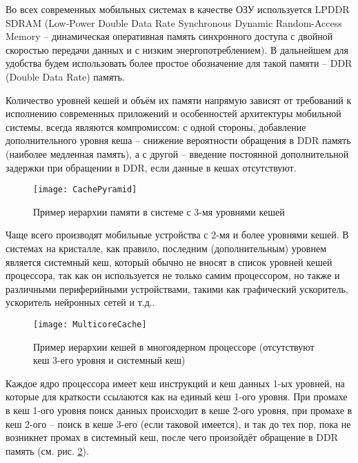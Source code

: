     Во всех современных мобильных системах в качестве ОЗУ используется LPDDR SDRAM
    (Low-Power Double Data Rate Synchronous Dynamic Random-Access Memory --
    динамическая оперативная память синхронного доступа с двойной скоростью передачи данных и
    с низким энергопотреблением). В дальнейшем для удобства будем использовать более простое
    обозначение для такой памяти -- DDR (Double Data Rate) память.

    Количество уровней кешей и объём их памяти напрямую зависят от требований к исполнению
    современных приложений и особенностей архитектуры мобильной системы,
    всегда являются компромиссом: с одной стороны, добавление дополнительного
    уровня кеша -- снижение вероятности обращения в DDR память (наиболее медленная память),
    а с другой -- введение постоянной дополнительной задержки при обращении в DDR, если данные
    в кешах отсутствуют.

    \begin{figure}[!h]
        \caption{Пример иерархии памяти в системе с 3-мя уровнями кешей}
        \centering
        \texttt{[image: CachePyramid]}
        \label{CachePyramid}
    \end{figure}

    Чаще всего производят мобильные устройства с 2-мя и более уровнями кешей. В системах на кристалле,
    как правило, последним (дополнительным) уровнем является системный кеш, который обычно
    не вносят в список уровней кешей процессора, так как он используется не только самим процессором,
    но также и различными периферийными устройствами, такими как графический ускоритель, ускоритель
    нейронных сетей и т.д..

    \begin{figure}[!h]
        \caption{Пример иерархии кешей в многоядерном процессоре (отсутствуют кеш 3-его уровня
            и системный кеш)}
        \centering
        \texttt{[image: MulticoreCache]}
        \label{MulticoreCache}
    \end{figure}

    Каждое ядро процессора имеет кеш инструкций и кеш данных 1-ых уровней, на которые для краткости
    ссылаются как на единый кеш 1-ого уровня.
    При промахе в кеш 1-ого уровня поиск данных происходит в кеше 2-ого уровня, при промахе
    в кеш 2-ого -- поиск в кеше 3-его (если таковой имеется), и так до тех пор, пока не возникнет
    промах в системный кеш, после чего произойдёт обращение в DDR память
    (см. рис. \ref{MulticoreCache}).

